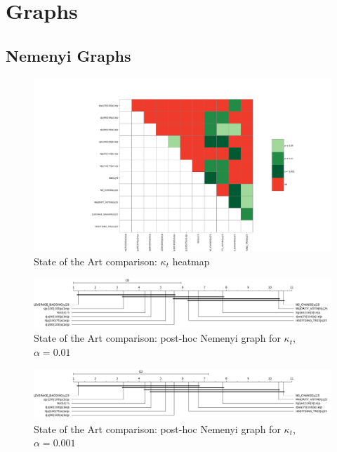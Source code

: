 \chapter{Graphs} %

\label{Appendix}


\section{\label{section:nemenyi-graphs-statistical-analysis}Nemenyi Graphs}

\begin{figure}
  \includegraphics[width=\linewidth]{./images/appendix/heatmap_nemenyi_graphs/kappa_t_heatmap}
\caption{\label{fig:sota_kappa_t_heatmap}State of the Art comparison: $\kappa_t$ heatmap}
\end{figure}

\begin{figure}
  \includegraphics[width=\linewidth]{./images/appendix/heatmap_nemenyi_graphs/sota_compare_all_kappa_nemenyi__0_99}
\caption{\label{fig:sota_kappa_t_099}State of the Art comparison: post-hoc Nemenyi graph for $\kappa_t$, $\alpha=0.01$}
\end{figure}

\begin{figure}
  \includegraphics[width=\linewidth]{./images/appendix/heatmap_nemenyi_graphs/sota_compare_all_kappa_nemenyi__0_999}
\caption{\label{fig:sota_kappa_t_0999}State of the Art comparison: post-hoc Nemenyi graph for $\kappa_t$, $\alpha=0.001$}
\end{figure}

